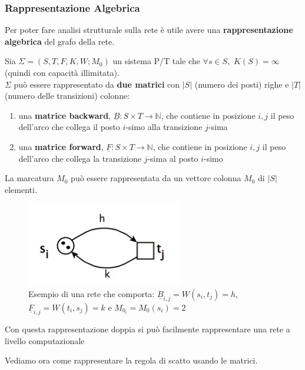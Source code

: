 \documentclass[a4paper,12pt, oneside]{book}
\begin{document}
\subsubsection{Rappresentazione Algebrica}
Per poter fare analisi strutturale sulla rete è utile avere una
\textbf{rappresentazione algebrica} del grafo della rete.
\begin{definizione}
  Sia $\Sigma = (S, T , F , K , W ; M_0 )$ un sistema P/T tale che $\forall s\in
  S,\,\,K(S)=\infty$ (quindi con capacità illimitata).\\
  $\Sigma$ può essere rappresentato da\textbf{ due matrici} con $|S|$ (numero
  dei posti) righe e $|T|$ (numero delle transizioni) colonne:
  \begin{enumerate}
    \item una \textbf{matrice backward}, $\underline{B}:S\times T\to
    \mathbb{N}$, che contiene in posizione $i,j$ il peso dell'arco che collega
    il posto $i$-simo alla transizione $j$-sima
    \item una \textbf{matrice forward}, $\underline{F}:S\times T\to \mathbb{N}$,
    che contiene in posizione $i,j$ il peso dell'arco che collega 
    la transizione $j$-sima al posto $i$-simo
  \end{enumerate}
  La marcatura $M_0$ può essere rappresentata da un vettore colonna $M_0$ di
  $|S|$ elementi.
  \begin{figure}[H]
    \centering
    \includegraphics[scale = 0.7]{img/al.jpg}
    \caption{Esempio di una rete che comporta:
      $\underline{B}_{i,j}=W(s_i,t_j)=h$,  $\underline{F}_{i,j}=W(t_i,s_j)=k$ e
      $M_{0_i}=M_0(s_i)=2$} 
  \end{figure}
  Con questa rappresentazione doppia si può facilmente rappresentare una rete a
  livello computazionale
\end{definizione}
\newpage
Vediamo ora come rappresentare la regola di scatto usando le matrici.
\end{document}
